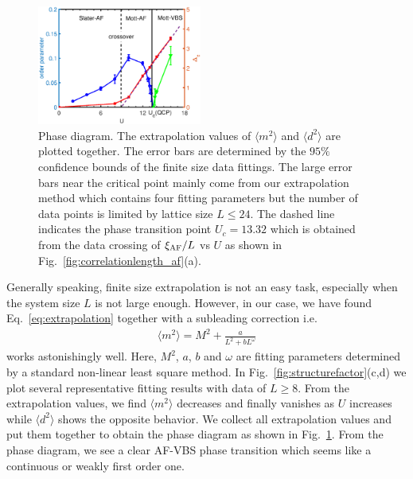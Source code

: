 \documentclass[twocolumn,superscriptaddress]{revtex4-1}
\begin{document}
\begin{figure}
    \includegraphics[width=0.48\textwidth]{phasediagram}
    \caption{\label{fig:phasediagram}Phase diagram. The extrapolation values of $\langle m^2 \rangle$ and $\langle d^2 \rangle$ are plotted together. The error bars are determined by the $95\%$ confidence bounds of the finite size data fittings. The large error bars near the critical point mainly come from our extrapolation method which contains four fitting parameters but the number of data points is limited by lattice size $L\le24$. The dashed line indicates the phase transition point $U_c=13.32$ which is obtained from the data crossing of $\xi_{\rm AF}/L$ vs $U$ as shown in Fig.~\ref{fig:correlationlength_af}(a).}
\end{figure}



Generally speaking, finite size extrapolation is not an easy task, especially when the system size $L$ is not large enough. However, in our case, we have found Eq.~\ref{eq:extrapolation} together with a subleading correction \cite{Sandvik2010a} i.e.
\begin{eqnarray}\label{eq:extrapolation_magic}
  \langle m^2 \rangle=M^2+\frac{a}{L^2+bL^\omega}
\end{eqnarray}
works astonishingly well. Here, $M^2$, $a$, $b$ and $\omega$ are fitting parameters determined by a standard non-linear least square method. 
In Fig.~\ref{fig:structurefactor}(c,d) we plot several representative fitting results with data of $L\ge8$. From the extrapolation values, we find $\langle m^2 \rangle$ decreases and finally vanishes as $U$ increases while $\langle d^2\rangle$ shows the opposite behavior. We collect all extrapolation values and put them together to obtain the phase diagram as shown in Fig.~\ref{fig:phasediagram}. From the phase diagram, we see a clear AF-VBS phase transition which seems like a continuous or weakly first order one.
\end{document}
